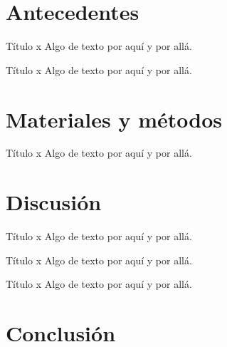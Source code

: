 \documentclass{beamer}
\begin{document}
\section{Antecedentes}

\begin{frame}{Título x}
	Algo de texto por aquí y por allá.
\end{frame}

\begin{frame}{Título x}
	Algo de texto por aquí y por allá.
\end{frame}


\section{Materiales y métodos}

\begin{frame}{Título x}
	Algo de texto por aquí y por allá.
\end{frame}


\section{Discusión}

\begin{frame}{Título x}
	Algo de texto por aquí y por allá.
\end{frame}

\begin{frame}{Título x}
	Algo de texto por aquí y por allá.
\end{frame}

\begin{frame}{Título x}
	Algo de texto por aquí y por allá.
\end{frame}


\section{Conclusión}
\end{document}
